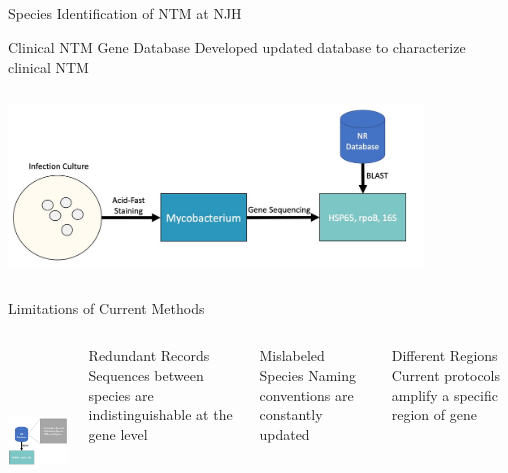 \documentclass[11pt, xcolor=table]{beamer}
\begin{document}
\subsection{}
	\begin{frame}{Species Identification of NTM at NJH}
  \begin{block}{Clinical NTM Gene Database}
  Developed updated database to characterize clinical NTM
  \end{block}
	\includegraphics[height=5cm, width=11cm]{CPBS_11_18/NJH_Protocol.jpg}
	
	\end{frame}
	\begin{frame}{Limitations of Current Methods}
	
	\begin{columns}
	\includegraphics[height=5cm, width=5.5cm]{CPBS_11_18/Issues.jpg}
	\begin{block}{Redundant Records}
	Sequences between species are indistinguishable at the gene level
	\end{block}
	\begin{block}{Mislabeled Species}
	Naming conventions are constantly updated
	\end{block}
	\begin{block}{Different Regions}
	Current protocols amplify a specific region of gene
	\end{block}
	\end{columns}
	
	\end{frame}
\end{document}
